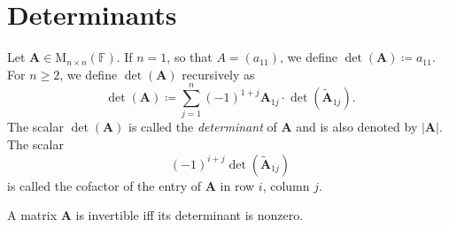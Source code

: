 \section{Determinants}
\begin{definition}{}{}
    Let \(\mathbf{A}\in \mathrm{M}_{n\times n}(\mathbb{F})\). If \(n=1\), so that \(A=(a_{11})\), we define \(\det(\mathbf{A})\coloneq a_{11}\). For \(n\geq 2\), we define \(\det(\mathbf{A})\) recursively as 
    \[\det(\mathbf{A})\coloneq \sum_{j=1}^{n}{(-1)^{1+j}}\mathbf{A}_{1j}\cdot \det(\widetilde{\mathbf{A}}_{1j}).\]
    The scalar \(\det(\mathbf{A})\) is called the \emph{determinant} of \(\mathbf{A}\) and is also denoted by \(\lvert \mathbf{A} \rvert\). The scalar 
    \[(-1)^{i+j}\det(\widetilde{\mathbf{A}}_{1j})\]
    is called the cofactor of the entry of \(\mathbf{A}\) in row \(i\), column \(j\).
\end{definition}
\begin{note}
    A matrix \(\mathbf{A}\) is invertible iff its determinant is nonzero. 
\end{note}
